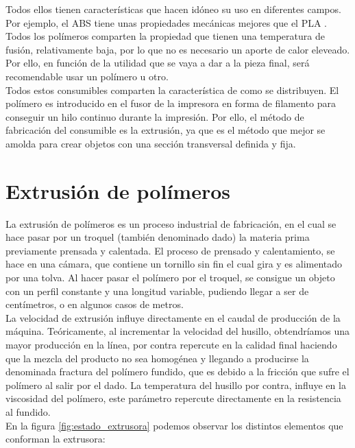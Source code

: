 Todos ellos tienen características que hacen idóneo su uso en diferentes campos. Por ejemplo, el ABS tiene unas propiedades mecánicas mejores que el PLA \cite{tfg_antonio}. Todos los polímeros comparten la propiedad que tienen una temperatura de fusión, relativamente baja, por lo que no es necesario un aporte de calor eleveado. Por ello, en función de la utilidad que se vaya a dar a la pieza final, será recomendable usar un polímero u otro.\\

Todos estos consumibles comparten la característica de como se distribuyen. El polímero es introducido en el fusor de la impresora en forma de filamento para conseguir un hilo continuo durante la impresión. Por ello, el método de fabricación del consumible es la extrusión, ya que es el método que mejor se amolda para crear objetos con una sección transversal definida y fija.\\

\section{Extrusión de polímeros}
\label{sec:extrusion}
La extrusión de polímeros es un proceso industrial de fabricación, en el cual se hace pasar por un troquel (también denominado dado) la materia prima previamente prensada y calentada. El proceso de prensado y calentamiento, se hace en una cámara, que contiene un tornillo sin fin el cual gira y es alimentado por una tolva. Al hacer pasar el polímero por el troquel, se consigue un objeto con un perfil constante y una longitud variable, pudiendo llegar a ser de centímetros, o en algunos casos de metros.\\

La velocidad de extrusión influye directamente en el caudal de producción de la máquina. Teóricamente, al incrementar la velocidad del husillo, obtendríamos una mayor producción en la línea, por contra repercute en la calidad final haciendo que la mezcla del producto no sea homogénea y llegando a producirse la denominada fractura del polímero fundido, que es debido a la fricción que sufre el polímero al salir por el dado. La temperatura del husillo por contra, influye en la viscosidad del polímero, este parámetro repercute directamente en la resistencia al fundido.\\

En la figura \ref{fig:estado_extrusora} podemos observar los distintos elementos que conforman la extrusora:

